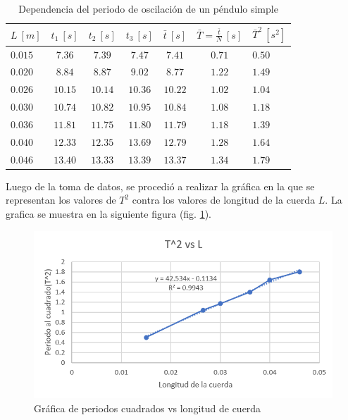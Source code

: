 \documentclass[spanish,notitlepage,letterpaper, 12pt]{article}
\begin{document}
\begin{table}[h]
    \centering
    \begin{tabular}{l|c|c|c|c|c|l}
        $L \ [m]$ & $t_1 \ [s]$ & $t_2 \ [s]$ & $t_3 \ [s]$ & $\bar{t} \ [s]$ & $\bar{T}=\frac{\bar{t}}{N} \ [s]$ & $\bar{T}^2 \ [s^2]$   \\
        \hline \hline
        $0.015$ & $7.36$ & $7.39$ & $7.47$ & $7.41$ & $0.71$ & $0.50$\\
        $0.020$ & $8.84$ & $8.87$ & $9.02$ & $8.77$ & $1.22$ & $1.49$\\
        $0.026$ & $10.15$ & $10.14$ & $10.36$ & $10.22$ & $1.02$ & $1.04$\\
        $0.030$ & $10.74$ & $10.82$ & $10.95$ & $10.84$ & $1.08$ & $1.18$\\
        $0.036$ & $11.81$ & $11.75$ & $11.80$ & $11.79$ & $1.18$ & $1.39$\\
        $0.040$ & $12.33$ & $12.35$ & $13.69$ & $12.79$ & $1.28$ & $1.64$\\
        $0.046$ & $13.40$ & $13.33$ & $13.39$ & $13.37$ & $1.34$ & $1.79$\\
    \end{tabular}
    \caption{Dependencia del periodo de oscilación de un péndulo simple}
    \label{Table 2}
\end{table}

Luego de la toma de datos, se procedió a realizar la gráfica en la que se representan los valores de $T^2$ contra los valores de longitud de la cuerda $L$. La grafica se muestra en la siguiente figura (fig. \ref{Figura 5}).
\newpage
\begin{figure}[h]
    \centering
    \includegraphics[width=15.0cm]{images/pc-vs-lc.png}
    \caption{Gráfica de periodos cuadrados vs longitud de cuerda}
    \label{Figura 5}
\end{figure}
\end{document}
